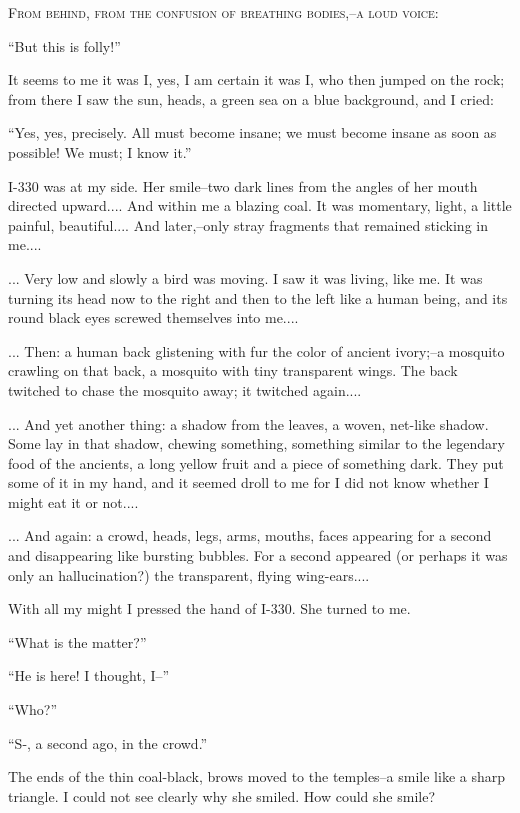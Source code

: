 \documentclass[11pt,openany]{book}
\begin{document}
\begin{center}\textsc{From behind, from the confusion of breathing bodies,--a loud voice:}\end{center}

``But this is folly!''

It seems to me it was I, yes, I am certain it was I, who then jumped on the rock; from there I saw the sun, heads, a green sea on a blue background, and I cried:

``Yes, yes, precisely. All must become insane; we must become insane as soon as possible! We must; I know it.''

I-330 was at my side. Her smile--two dark lines from the angles of her mouth directed upward.... And within me a blazing coal. It was momentary, light, a little painful, beautiful.... And later,--only stray fragments that remained sticking in me....

... Very low and slowly a bird was moving. I saw it was living, like me. It was turning its head now to the right and then to the left like a human being, and its round black eyes screwed themselves into me....

... Then: a human back glistening with fur the color of ancient ivory;--a mosquito crawling on that back, a mosquito with tiny transparent wings. The back twitched to chase the mosquito away; it twitched again....

... And yet another thing: a shadow from the leaves, a woven, net-like shadow. Some lay in that shadow, chewing something, something similar to the legendary food of the ancients, a long yellow fruit and a piece of something dark. They put some of it in my hand, and it seemed droll to me for I did not know whether I might eat it or not....

... And again: a crowd, heads, legs, arms, mouths, faces appearing for a second and disappearing like bursting bubbles. For a second appeared (or perhaps it was only an hallucination?) the transparent, flying wing-ears....

With all my might I pressed the hand of I-330. She turned to me.

``What is the matter?''

``He is here! I thought, I--''

``Who?''

``S-, a second ago, in the crowd.''

The ends of the thin coal-black, brows moved to the temples--a smile like a sharp triangle. I could not see clearly why she smiled. How could she smile?
\end{document}
